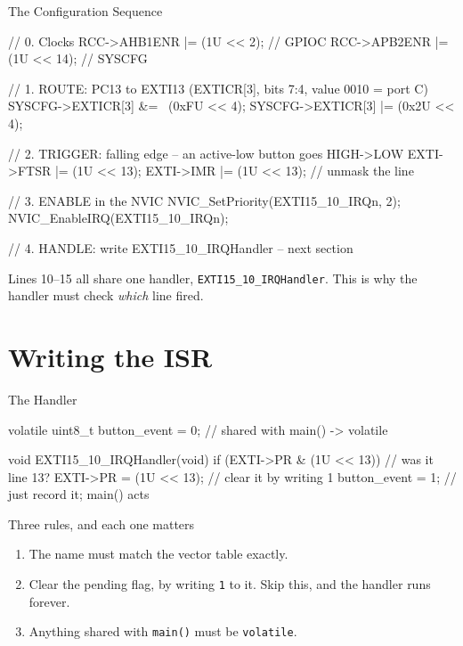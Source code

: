 \documentclass[9pt,aspectratio=169,xcolor=table]{beamer}
\begin{document}
\begin{frame}[fragile]{The Configuration Sequence}
\begin{cc}[basicstyle=\ttfamily\small, numbers=left]
// 0. Clocks
RCC->AHB1ENR |= (1U << 2);        // GPIOC
RCC->APB2ENR |= (1U << 14);       // SYSCFG

// 1. ROUTE: PC13 to EXTI13  (EXTICR[3], bits 7:4, value 0010 = port C)
SYSCFG->EXTICR[3] &= ~(0xFU << 4);
SYSCFG->EXTICR[3] |=  (0x2U << 4);

// 2. TRIGGER: falling edge -- an active-low button goes HIGH->LOW
EXTI->FTSR |= (1U << 13);
EXTI->IMR  |= (1U << 13);         // unmask the line

// 3. ENABLE in the NVIC
NVIC_SetPriority(EXTI15_10_IRQn, 2);
NVIC_EnableIRQ(EXTI15_10_IRQn);

// 4. HANDLE: write EXTI15_10_IRQHandler -- next section
\end{cc}

    \vspace{1mm}
    {\small Lines 10--15 all share one handler,
    \texttt{EXTI15\_10\_IRQHandler}. This is why the handler must check
    \emph{which} line fired.}
\end{frame}


\section{Writing the ISR}

\begin{frame}[fragile]{The Handler}
\begin{cc}[basicstyle=\ttfamily\small]
volatile uint8_t button_event = 0;     // shared with main() -> volatile

void EXTI15_10_IRQHandler(void)
{
    if (EXTI->PR & (1U << 13)) {       // was it line 13?
        EXTI->PR = (1U << 13);         // clear it by writing 1
        button_event = 1;              // just record it; main() acts
    }
}
\end{cc}

    \vspace{5mm}
    \begin{block}{Three rules, and each one matters}
        \begin{enumerate}
            \item The \alert{name} must match the vector table exactly.
            \item \alert{Clear the pending flag}, by writing \texttt{1} to
                  it. Skip this, and the handler runs forever.
            \item Anything shared with \texttt{main()} must be
                  \alert{\texttt{volatile}}.
        \end{enumerate}
    \end{block}
\end{frame}
\end{document}
